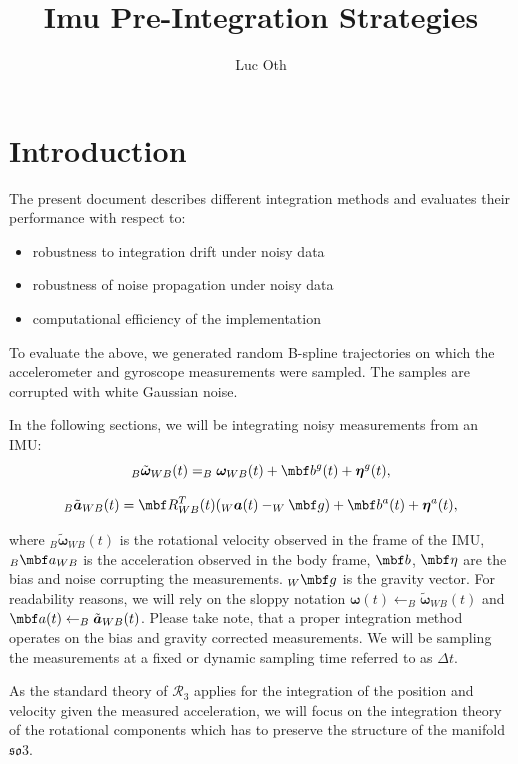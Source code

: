 \documentclass[10pt,a4paper]{article}
\author{Luc Oth}
\title{Imu Pre-Integration Strategies}
\newcommand{\mbs}[1]{{\boldsymbol{#1}}}
\numberwithin{equation}{section}
\begin{document}
\maketitle

\section{Introduction}
The present document describes different integration methods and evaluates their performance with respect to:
\begin{itemize}
\item robustness to integration drift under noisy data
\item robustness of noise propagation under noisy data
\item computational efficiency of the implementation
\end{itemize}

To evaluate the above, we generated random B-spline trajectories on which the accelerometer and gyroscope measurements were sampled. The samples are corrupted with white Gaussian noise.

In the following sections, we will be integrating noisy measurements from an IMU:
\begin{equation}
 _B \tilde { \mbs \omega}_{WB}(t) =  _B \mbs \omega_{WB}(t) + \mbf b^g(t) + \mbs \eta^g(t),
\end{equation}

\begin{equation}
 _B \tilde { \mbs a}_{WB}(t) =  \mbf R_{WB}^T(t)  (_W \mbs a(t) - _W\mbf g )+ \mbf b^a(t) + \mbs \eta^a(t),
\end{equation}

where $_B \tilde{\mbs \omega}_{WB}(t)$ is the rotational velocity observed in the frame of the IMU, $_B \mbf  a_{WB}$ is the acceleration observed in the body frame, $\mbf b$, $\mbf \eta$ are the bias and noise corrupting the measurements. $_W \mbf  g$ is the gravity vector. For readability reasons, we will rely on the sloppy notation $\mbs \omega(t) \leftarrow _B \tilde { \mbs \omega}_{WB}(t)$ and $\mbf a(t) \leftarrow _B \tilde { \mbs a}_{WB}(t)$. Please take note, that a proper integration method operates on the bias and gravity corrected measurements.
We will be sampling the measurements at a fixed or dynamic sampling time referred to as $\Delta t$.

As the standard theory of $\mathcal{R}_3$ applies for the integration of the position and velocity given the measured acceleration, we will focus on the integration theory of the rotational components which has to preserve the structure of the manifold $\mathfrak{so}3$.
\end{document}
